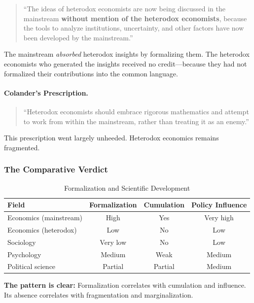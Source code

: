 \begin{quote}
``The ideas of heterodox economists are now being discussed in the mainstream
\textbf{without mention of the heterodox economists}, because the tools to
analyze institutions, uncertainty, and other factors have now been developed
by the mainstream.''
\end{quote}

The mainstream \textit{absorbed} heterodox insights by formalizing them.
The heterodox economists who generated the insights received no credit---because
they had not formalized their contributions into the common language.

\paragraph{Colander's Prescription.}
\begin{quote}
``Heterodox economists should embrace rigorous mathematics and attempt to work
from within the mainstream, rather than treating it as an enemy.''
\citep{colander2004changing}
\end{quote}

This prescription went largely unheeded. Heterodox economics remains fragmented.

\subsubsection{The Comparative Verdict}

\begin{table}[htbp]
\centering
\caption{Formalization and Scientific Development}
\label{tab:formalization-verdict}
\renewcommand{\arraystretch}{1.3}
\small
\begin{tabular}{@{}lccc@{}}
\toprule
\textbf{Field} & \textbf{Formalization} & \textbf{Cumulation} & \textbf{Policy Influence} \\
\midrule
Economics (mainstream) & High & Yes & Very high \\
Economics (heterodox) & Low & No & Low \\
Sociology & Very low & No & Low \\
Psychology & Medium & Weak & Medium \\
Political science & Partial & Partial & Medium \\
\bottomrule
\end{tabular}
\end{table}

\textbf{The pattern is clear:} Formalization correlates with cumulation and influence.
Its absence correlates with fragmentation and marginalization.

